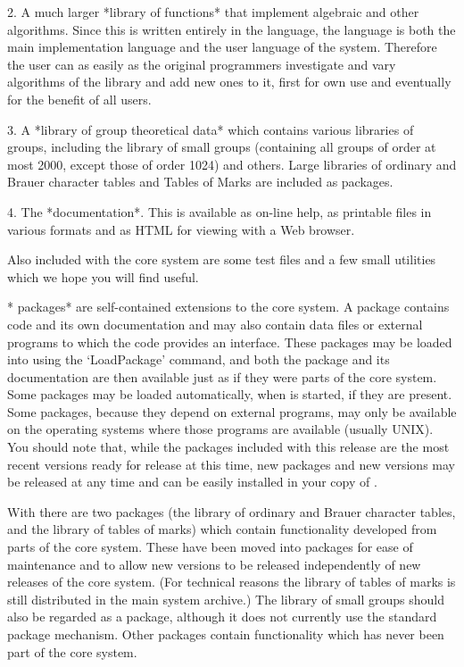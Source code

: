   \item{2.}  
	A much larger *library of {\GAP} functions* that
  implement algebraic and other algorithms.  Since this is written
  entirely in the {\GAP} language, the {\GAP} language is both the
  main implementation language and the user language of the system.
  Therefore the user can as easily as the original programmers
  investigate and vary algorithms of the library and add new ones to
  it, first for own use and eventually for the benefit of all {\GAP}
  users.

  \item{3.}  
	A *library of group theoretical data* which contains
  various libraries of groups, including the library of small groups
  (containing all groups of order at most 2000, except those of order
  1024) and others. Large libraries of ordinary and Brauer character
  tables and Tables of Marks are included as packages.

  \item{4.}
    The *documentation*.  This is available as on-line help, as
    printable files in various formats and as HTML for viewing
    with a Web browser.

\endlist

Also included with the core system are some test files and a few
small utilities which we hope you will find useful.


*{\GAP} packages* are self-contained extensions to the core system.  A
package contains {\GAP} code and its own documentation and may also
contain data files or external programs to which the {\GAP} code
provides an interface.  These packages may be loaded into {\GAP} using
the `LoadPackage' command, and both the package and its
documentation are then available just as if they were parts of the
core system. Some packages may be loaded automatically, when {\GAP} is
started, if they are present. Some packages, because they depend on
external programs, may only be available on the operating systems
where those programs are available (usually UNIX). You should note
that, while the packages included with this release are the most
recent versions ready for release at this time, new packages and new
versions may be released at any time and can be easily installed in
your copy of {\GAP}.

With {\GAP} there are two packages (the library of ordinary and
Brauer character tables, and the library of tables of marks) which
contain functionality developed from parts of the {\GAP} core
system. These have been moved into packages for ease of maintenance
and to allow new versions to be released independently of new releases
of the core system. (For technical reasons the library of tables of marks is
still distributed in the main system archive.) 
The library of small groups should also be
regarded as a package, although it does not currently use the standard
package mechanism.  Other packages contain functionality which has
never been part of the core system.


